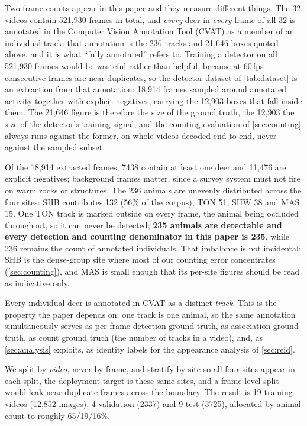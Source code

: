 Two frame counts appear in this paper and they measure different things. The 32 videos
contain 521,930 frames in total, and \emph{every} deer in \emph{every} frame of all 32 is
annotated in the Computer Vision Annotation Tool (CVAT) as a member of an individual track: that annotation is the 236 tracks and
21,646 boxes quoted above, and it is what ``fully annotated'' refers to. Training a detector
on all 521,930 frames would be wasteful rather than helpful, because at 60\,fps consecutive frames are near-duplicates, so the detector dataset of \cref{tab:dataset} is an extraction from
that annotation: 18,914 frames sampled around annotated activity together with explicit
negatives, carrying the 12,903 boxes that fall inside them. The 21,646 figure is therefore the
size of the ground truth, the 12,903 the size of the detector's training signal, and the
counting evaluation of \cref{sec:counting} always runs against the former, on whole videos
decoded end to end, never against the sampled subset.

Of the 18,914 extracted frames, 7438 contain at least one deer and 11,476 are explicit
negatives; background frames matter, since a survey system must not fire on warm rocks or
structures. The 236 animals are unevenly distributed across the four sites: SHB contributes 132 (56\% of
the corpus), TON 51, SHW 38 and MAS 15. One TON track is marked outside on every frame, the
animal being occluded throughout, so it can never be detected; \textbf{235 animals are
detectable and every detection and counting denominator in this paper is 235}, while 236
remains the count of annotated individuals. That imbalance is not incidental: SHB is the dense-group site where most of our counting error concentrates
(\cref{sec:counting}), and MAS is small enough that its per-site figures should be read as
indicative only.

Every individual deer is annotated in CVAT as a distinct \emph{track}. This is the property
the paper depends on: one track is one animal, so the same annotation simultaneously serves
as per-frame detection ground truth, as association ground truth, as count ground truth
(the number of tracks in a video), and, as \cref{sec:analysis} exploits, as identity labels for the appearance analysis of \cref{sec:reid}.

We split by \emph{video}, never by frame, and stratify by site so all four sites appear in
each split, the deployment target is these same sites, and a frame-level split would leak
near-duplicate frames across the boundary. The result is 19 training videos (12,852 images),
4 validation (2337) and 9 test (3725), allocated by animal count to roughly 65/19/16\%.

